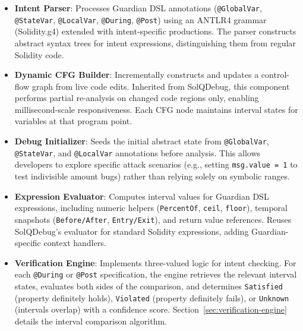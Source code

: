 \documentclass[pdflatex,sn-basic]{sn-jnl}%
\theoremstyle{thmstyleone}%
\theoremstyle{thmstyletwo}%
\theoremstyle{thmstylethree}%
\begin{document}
\begin{itemize}
    \item \textbf{Intent Parser}: Processes Guardian DSL annotations (\texttt{@GlobalVar}, \texttt{@StateVar}, \texttt{@LocalVar}, \texttt{@During}, \texttt{@Post}) using an ANTLR4 grammar (Solidity.g4) extended with intent-specific productions. The parser constructs abstract syntax trees for intent expressions, distinguishing them from regular Solidity code.

    \item \textbf{Dynamic CFG Builder}: Incrementally constructs and updates a control-flow graph from live code edits. Inherited from SolQDebug, this component performs partial re-analysis on changed code regions only, enabling millisecond-scale responsiveness. Each CFG node maintains interval states for variables at that program point.

    \item \textbf{Debug Initializer}: Seeds the initial abstract state from \texttt{@GlobalVar}, \texttt{@StateVar}, and \texttt{@LocalVar} annotations before analysis. This allows developers to explore specific attack scenarios (e.g., setting \texttt{msg.value = 1} to test indivisible amount bugs) rather than relying solely on symbolic ranges.

    \item \textbf{Expression Evaluator}: Computes interval values for Guardian DSL expressions, including numeric helpers (\texttt{PercentOf}, \texttt{ceil}, \texttt{floor}), temporal snapshots (\texttt{Before/After}, \texttt{Entry/Exit}), and return value references. Reuses SolQDebug's evaluator for standard Solidity expressions, adding Guardian-specific context handlers.

    \item \textbf{Verification Engine}: Implements three-valued logic for intent checking. For each \texttt{@During} or \texttt{@Post} specification, the engine retrieves the relevant interval states, evaluates both sides of the comparison, and determines \texttt{Satisfied} (property definitely holds), \texttt{Violated} (property definitely fails), or \texttt{Unknown} (intervals overlap) with a confidence score. Section~\ref{sec:verification-engine} details the interval comparison algorithm.
\end{itemize}
\end{document}
